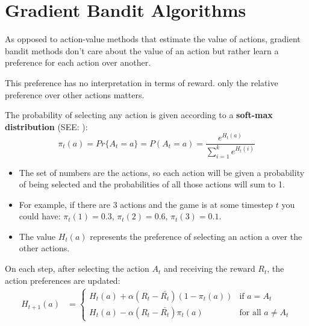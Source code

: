 \section{Gradient Bandit Algorithms \cite{medium-numsmt2-rl-ch2-part-5}}\label{MAB: Gradient Bandit Algorithms}

As opposed to action-value methods that estimate the value of actions, gradient bandit methods don’t care about the value of an action but rather learn a preference for each action over another.

This preference has no interpretation in terms of reward. only the relative preference over other actions matters.

The probability of selecting any action is given according to a \textbf{soft-max distribution} (SEE: ):
\[
    \pi_t(a) = Pr\{A_t = a\} = P(A_t=a) = \displaystyle\frac{e^{H_t(a)}}{\displaystyle\sum_{i=1}^{k} e^{H_t(i)}}
\]

\begin{itemize}
    \item The set of numbers are the actions, so each action will be given a probability of being selected and the probabilities of all those actions will sum to 1.
    \item For example, if there are 3 actions and the game is at some timestep $t$ you could have: $\pi_t(1) = 0.3$, $\pi_t(2) = 0.6$, $\pi_t(3) = 0.1$.
    \item The value $H_t(a)$ represents the preference of selecting an action a over the other actions.
\end{itemize}

\vspace{0.2cm}

On each step, after selecting the action $A_t$ and receiving the reward $R_t$, the action preferences are updated:
\begin{align}
    H_{t+1}(a) &= 
    \begin{cases}
        H_t(a) + \alpha(R_t - \bar{R_t})(1-\pi_t(a)) & \text{if } a = A_t \\
        H_t(a) - \alpha(R_t - \bar{R_t})\pi_t(a) & \text{for all } a \neq A_t
    \end{cases}
\end{align}

